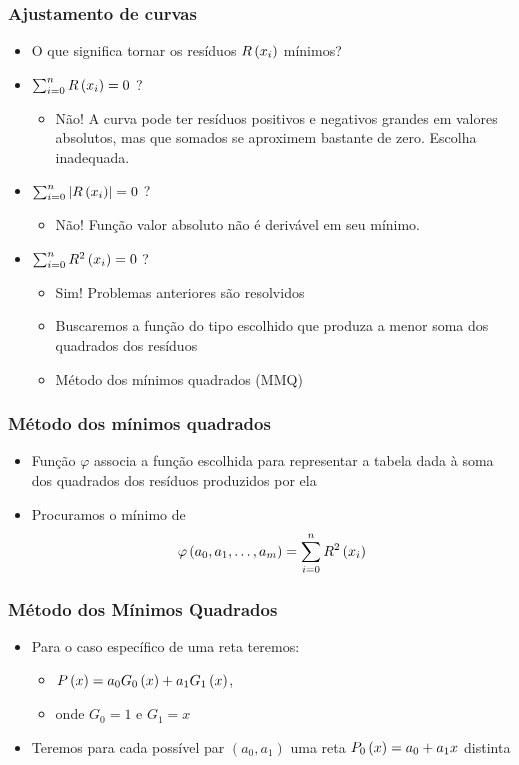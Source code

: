 \begin{frame}
\frametitle{Ajustamento de curvas}

\begin{itemize}
  \item O que significa tornar os resíduos $R\left(x_i\right)$ mínimos?
  \item $\sum_{i=0}^n R\left(x_i\right) = 0$ ?
    \begin{itemize}
      \item Não! A curva pode ter resíduos positivos e negativos grandes em valores absolutos, mas que somados se aproximem bastante de zero. Escolha inadequada.
    \end{itemize}
  \item $\sum_{i=0}^n \left|R\left(x_i\right)\right| = 0$ ?
    \begin{itemize}
      \item Não! Função valor absoluto não é derivável em seu mínimo. 
    \end{itemize}  
  \item $\sum_{i=0}^n R^2\left(x_i\right) = 0$ ?
    \begin{itemize}
      \item Sim! Problemas anteriores são resolvidos
      \item Buscaremos a função do tipo escolhido que produza a menor soma dos quadrados dos resíduos
      \item Método dos mínimos quadrados (MMQ)
    \end{itemize}
\end{itemize}
\end{frame}

\begin{frame}
\frametitle{Método dos mínimos quadrados}

\begin{itemize}
  \item Função $\varphi$ associa a função escolhida para representar a tabela dada à soma dos quadrados dos resíduos produzidos por ela
  \item Procuramos o mínimo de\\
  \[\varphi\left(a_0,a_1,\ldots,a_m\right) = \sum_{i=0}^{n}R^2\left(x_i\right)\]
\end{itemize}
\end{frame}

\begin{frame}
\frametitle{Método dos Mínimos Quadrados}

\begin{itemize}
  \item Para o caso específico de uma reta teremos:
    \begin{itemize}
      \item $P\left(x\right) = a_0 G_0 \left(x\right) + a_1 G_1 \left(x\right)$,
      \item onde $G_0 = 1$ e $G_1 = x$
    \end{itemize}
  \item Teremos para cada possível par $\left(a_0, a_1\right)$ uma reta $P_0 \left(x\right) = a_0 + a_1 x$ distinta
\end{itemize}
\end{frame}

